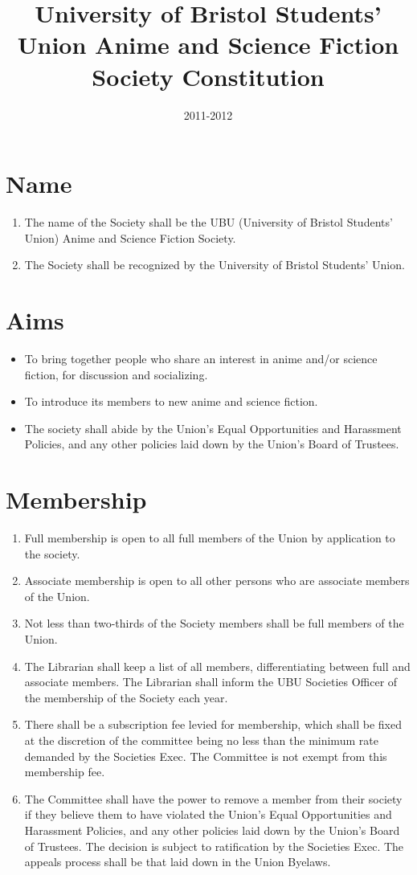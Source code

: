 \documentclass[a4paper,10pt]{article}
\title{University of Bristol Students’ Union Anime and Science Fiction Society Constitution}
\date{2011-2012}
\begin{document}
\maketitle
\section{Name}
\begin{enumerate}
  \item The name of the Society shall be the UBU (University of Bristol Students’ Union) Anime and Science Fiction Society.
  \item The Society shall be recognized by the University of Bristol Students’ Union.
\end{enumerate}

\section{Aims}
\begin{itemize}
  \item To bring together people who share an interest in anime and/or science fiction, for discussion and socializing.
  \item To introduce its members to new anime and science fiction.
  \item The society shall abide by the Union’s Equal Opportunities and Harassment Policies, and any other policies laid down by the Union’s Board of Trustees.
\end{itemize}


\section{Membership}
\begin{enumerate}
  \item Full membership is open to all full members of the Union by application to the society.
  \item Associate membership is open to all other persons who are associate members of the Union.
  \item Not less than two-thirds of the Society members shall be full members of the Union.
  \item The Librarian shall keep a list of all members, differentiating between full and associate members. The Librarian shall inform the UBU Societies Officer of the membership of the Society each year.
  \item There shall be a subscription fee levied for membership, which shall be fixed at the discretion of the committee being no less than the minimum rate demanded by the Societies Exec. The Committee is not exempt from this membership fee.
  \item The Committee shall have the power to remove a member from their society if they believe them to have violated the Union’s Equal Opportunities and Harassment Policies, and any other policies laid down by the Union’s Board of Trustees. The decision is subject to ratification by the Societies Exec. The appeals process shall be that laid down in the Union Byelaws.
\end{enumerate}
\end{document}
